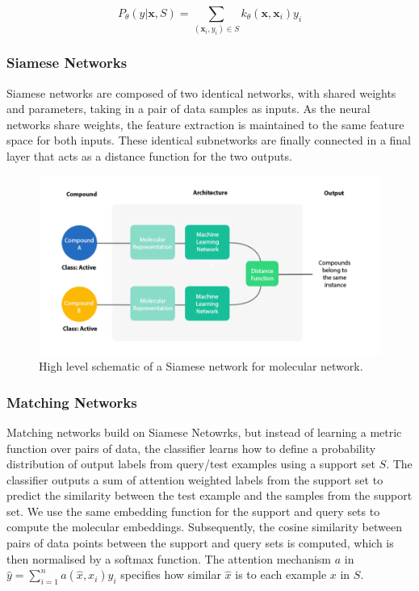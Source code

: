 \begin{equation}
	\label{kernel}
	P_\theta(y \vert \mathbf{x}, S) = \sum_{(\mathbf{x}_i, y_i) \in S} k_\theta(\mathbf{x}, \mathbf{x}_i)y_i
\end{equation}

\subsubsection{Siamese Networks}

Siamese networks \cite{bromley1993signature, koch2015siamese} are composed of two identical networks, with shared weights and parameters, taking in a pair of data samples as inputs. As the neural networks share weights, the feature extraction is maintained to the same feature space for both inputs. These identical subnetworks are finally connected in a final layer that acts as a distance function for the two outputs.

\begin{figure}[h]
	\centering
	\includegraphics[width=0.9\linewidth]{img/high-level siamese.png}
	\caption[High level schematic of Siamese network]{High level schematic of a Siamese network for molecular network. }
	\label{fig:siamesenetarchi}
\end{figure}

\subsubsection{Matching Networks}

Matching networks \cite{vinyals2016matching} build on Siamese Netowrks, but instead of learning a metric function over pairs of data, the classifier learns how to define a probability distribution of output labels from query/test examples using a support set $S$. The classifier outputs a sum of attention weighted labels from the support set to predict the similarity between the test example and the samples from the support set. We use the same embedding function for the support and query sets to compute the molecular embeddings. Subsequently, the cosine similarity between pairs of data points between the support and query sets is computed, which is then normalised by a softmax function. The attention mechanism $a$ in $\hat{y} = \sum_{i=1}^{n} a(\hat{x}, x_i)y_i$ specifies how similar $\hat{x}$ is to each example $x$ in $S$.

